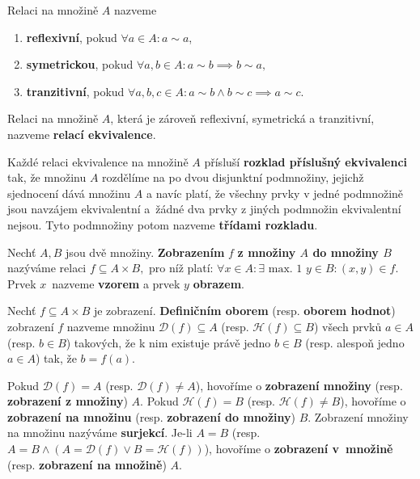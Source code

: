 \begin{definition}\label{reflsymtran}
  Relaci na množině $A$ nazveme
  \begin{enumerate}[$i.$]
    \item \textbf{reflexivní}, pokud $\forall a\in A\colon a\sim a$,
    \item \textbf{symetrickou}, pokud $\forall a,b \in A\colon a\sim b \implies b\sim a,$
    \item \textbf{tranzitivní}, pokud $\forall a,b,c\in A\colon a\sim b \land b\sim c \implies a\sim c.$
  \end{enumerate}
\end{definition}

\begin{definition}\label{ekvivalence}
  Relaci na množině $A$, která je zároveň reflexivní, symetrická a tranzitivní, nazveme \textbf{relací ekvivalence}.
\end{definition}

\begin{pozn}\label{rozkladprislusnyekvivalenci}
  Každé relaci ekvivalence na množině $A$ přísluší \textbf{rozklad příslušný ekvivalenci} tak, že množinu $A$ rozdělíme na po dvou disjunktní podmnožiny,
  jejichž sjednocení dává množinu $A$ a navíc platí, že všechny prvky v jedné podmnožině jsou navzájem ekvivalentní a~žádné dva prvky z jiných podmnožin ekvivalentní nejsou. Tyto podmnožiny potom nazveme \textbf{třídami rozkladu}.
\end{pozn}

\begin{definition}
  Nechť $A,B$ jsou dvě množiny. \textbf{Zobrazením} $f$ \textbf{z množiny $A$ do množiny $B$} nazýváme relaci $f\subseteq A \times B,$ pro níž platí: $\forall x \in A\colon \exists \text{ max. 1 } y \in B\colon (x,y) \in f$. Prvek $x$~nazveme \textbf{vzorem} a prvek $y$ \textbf{obrazem}.
\end{definition}

\begin{definition}
  Nechť $f\subseteq A\times B$ je zobrazení. \textbf{Definičním oborem} (resp. \textbf{oborem hodnot}) zobrazení $f$ nazveme množinu $\mathcal D(f)\subseteq A$
  (resp. $\mathcal H(f)\subseteq B$) všech prvků $a\in A$ (resp. $b\in B$) takových, že k nim existuje právě jedno $b\in B$ (resp. alespoň jedno $a\in A$) tak, že $b=f(a)$.
\end{definition}

\begin{definition}
  Pokud $\mathcal D(f) = A$ (resp. $\mathcal D(f)\ne A$), hovoříme o \textbf{zobrazení množiny} (resp. \textbf{zobrazení z množiny}) $A$. Pokud $\mathcal H(f)=B$ (resp. $\mathcal H(f)\ne B$), hovoříme o \textbf{zobrazení na množinu} (resp. \textbf{zobrazení do množiny}) $B$.
  Zobrazení množiny na množinu nazýváme \textbf{surjekcí}. Je-li $A=B$ (resp. $A=B \land ( A = \mathcal D(f) \lor B = \mathcal H(f))$), hovoříme o \textbf{zobrazení v~množině} (resp. \textbf{zobrazení na množině}) $A$.
\end{definition}

